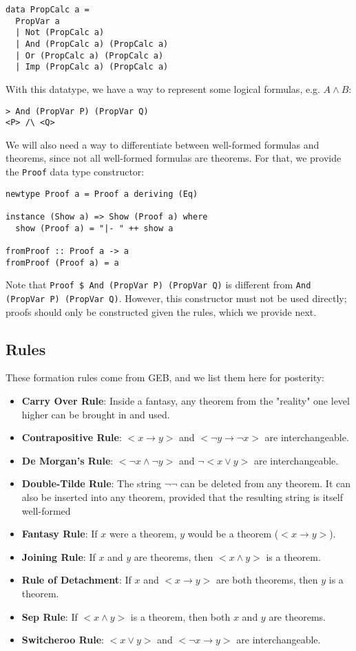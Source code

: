 \documentclass{article}
\begin{document}
\begin{lstlisting}
data PropCalc a =
  PropVar a
  | Not (PropCalc a)
  | And (PropCalc a) (PropCalc a)
  | Or (PropCalc a) (PropCalc a)
  | Imp (PropCalc a) (PropCalc a)
\end{lstlisting}

With this datatype, we have a way to represent some logical formulas, e.g. $A \land B$:

\begin{lstlisting}
> And (PropVar P) (PropVar Q)
<P> /\ <Q>
\end{lstlisting}

We will also need a way to differentiate between well-formed formulas and theorems, since not all well-formed formulas are theorems. For that, we provide the \texttt{Proof} data type constructor:

\begin{lstlisting}
newtype Proof a = Proof a deriving (Eq)

instance (Show a) => Show (Proof a) where
  show (Proof a) = "|- " ++ show a

fromProof :: Proof a -> a
fromProof (Proof a) = a
\end{lstlisting}

Note that \texttt{Proof \$ And (PropVar P) (PropVar Q)} is different from \texttt{And (PropVar P) (PropVar Q)}. However, this constructor must not be used directly; proofs should only be constructed given the rules, which we provide next.

\subsection{Rules}

These formation rules come from GEB, and we list them here for posterity:

\begin{itemize}
\item \textbf{Carry Over Rule}: Inside a fantasy, any theorem from the "reality" one level higher can be brought in and used.
\item \textbf{Contrapositive Rule}: $< x \to y>$ and $< \neg y \to \neg x>$ are interchangeable.
\item \textbf{De Morgan's Rule}: $< \neg x \land \neg y>$ and $\neg<x \lor y>$ are interchangeable.
\item \textbf{Double-Tilde Rule}: The string $\neg\neg$ can be deleted from any theorem. It can also be inserted into any theorem, provided that the resulting string is itself well-formed
\item \textbf{Fantasy Rule}: If $x$ were a theorem, $y$ would be a theorem ($<x \to y>$).
\item \textbf{Joining Rule}: If $x$ and $y$ are theorems, then $<x \land y>$ is a theorem.
\item \textbf{Rule of Detachment}: If $x$ and $<x \to y>$ are both theorems, then $y$ is a theorem.
\item \textbf{Sep Rule}: If $<x \land y>$ is a theorem, then both $x$ and $y$ are theorems.
\item \textbf{Switcheroo Rule}: $<x \lor y>$ and $<\neg x \to y>$ are interchangeable.
\end{itemize}
\end{document}
